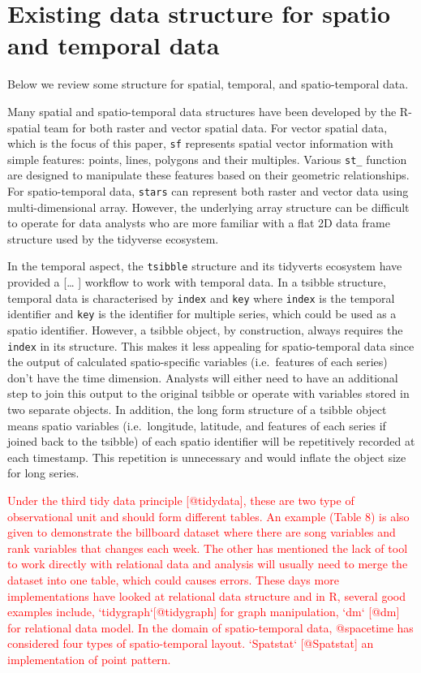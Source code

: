 \documentclass[
]{jss}
\begin{document}
\hypertarget{existing-data-structure-for-spatio-and-temporal-data}{%
\section{Existing data structure for spatio and temporal
data}\label{existing-data-structure-for-spatio-and-temporal-data}}

Below we review some structure for spatial, temporal, and
spatio-temporal data.

Many spatial and spatio-temporal data structures have been developed by
the R-spatial team for both raster and vector spatial data. For vector
spatial data, which is the focus of this paper, \texttt{sf}
\citep{pebesma2018simple} represents spatial vector information with
simple features: points, lines, polygons and their multiples. Various
\texttt{st\_} function are designed to manipulate these features based
on their geometric relationships. For spatio-temporal data,
\texttt{stars} \citep{stars} can represent both raster and vector data
using multi-dimensional array. However, the underlying array structure
can be difficult to operate for data analysts who are more familiar with
a flat 2D data frame structure used by the tidyverse ecosystem.

In the temporal aspect, the \texttt{tsibble} \citep{tsibbles} structure
and its tidyverts ecosystem have provided a {[}\ldots{} {]} workflow to
work with temporal data. In a tsibble structure, temporal data is
characterised by \texttt{index} and \texttt{key} where \texttt{index} is
the temporal identifier and \texttt{key} is the identifier for multiple
series, which could be used as a spatio identifier. However, a tsibble
object, by construction, always requires the \texttt{index} in its
structure. This makes it less appealing for spatio-temporal data since
the output of calculated spatio-specific variables (i.e.~features of
each series) don't have the time dimension. Analysts will either need to
have an additional step to join this output to the original tsibble or
operate with variables stored in two separate objects. In addition, the
long form structure of a tsibble object means spatio variables
(i.e.~longitude, latitude, and features of each series if joined back to
the tsibble) of each spatio identifier will be repetitively recorded at
each timestamp. This repetition is unnecessary and would inflate the
object size for long series.

\textcolor{red}{Under the third tidy data principle [@tidydata], these are two type of observational unit and should form different tables. An example (Table 8) is also given to demonstrate the billboard dataset where there are song variables and rank variables that changes each week. The other has mentioned the lack of tool to work directly with relational data and analysis will usually need to merge the dataset into one table, which could causes errors. These days more implementations have looked at relational data structure and in R, several good examples include, `tidygraph`[@tidygraph] for graph manipulation, `dm` [@dm] for relational data model. In the domain of spatio-temporal data, @spacetime has considered four types of spatio-temporal layout. `Spatstat` [@Spatstat] an implementation of point pattern.  }
\end{document}
